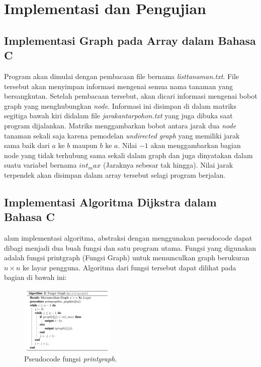 \documentclass[conference]{IEEEtran}
\begin{document}
\section{Implementasi dan Pengujian}

\subsection{Implementasi Graph pada Array dalam Bahasa C}

    Program akan dimulai dengan pembacaan file bernama
    \textit{listtanaman.txt}. File tersebut akan menyimpan informasi mengenai semua nama tanaman yang bersangkutan. Setelah pembacaan tersebut, akan dicari informasi mengenai bobot graph
    yang menghubungkan \textit{node}. Informasi ini disimpan di dalam
    matriks segitiga bawah kiri didalam file \textit{jarakantarpohon.txt}
    yang juga dibuka saat program dijalankan. Matriks menggambarkan bobot antara jarak dua \textit{node} tanaman sekali saja karena
    pemodelan \textit{undirected graph} yang memiliki jarak sama baik
    dari $a$ ke $b$ maupun $b$ ke $a$. Nilai $-1$ akan menggambarkan
    bagian node yang tidak terhubung sama sekali dalam graph 
    dan juga dinyatakan dalam suatu variabel bernama $int_max$
    (Jaraknya sebesar tak hingga). Nilai jarak terpendek akan
    disimpan dalam array tersebut selagi program berjalan.

\subsection{Implementasi Algoritma Dijkstra dalam Bahasa C}

    alam implementasi algoritma, abstraksi dengan menggunakan pseudocode dapat dibagi menjadi dua buah fungsi dan
    satu program utama. Fungsi yang digunakan adalah fungsi
    printgraph (Fungsi Graph) untuk memunculkan graph berukuran $n \times n$ ke layar pengguna. Algoritma dari fungsi tersebut
    dapat dilihat pada bagian di bawah ini:

    \begin{figure}[htbp]
        \centerline{\includegraphics[width=0.4\textwidth]{./sources/printgraph.png}}
        \caption{Pseudocode fungsi \textit{printgraph}.}
        \label{fig3}
    \end{figure}
\end{document}
